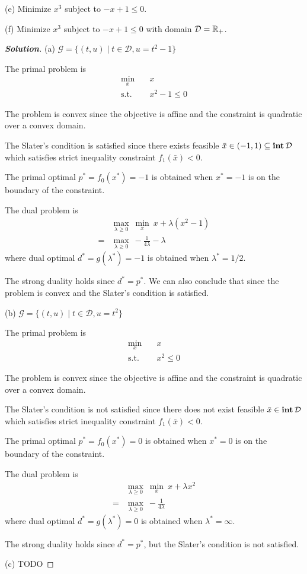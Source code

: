 \documentclass[11pt]{article}
\newenvironment{solution}
  {\renewcommand\qedsymbol{$\square$}\begin{proof}[\textbf{Solution}]}
  {\end{proof}}
\begin{document}
(e) Minimize $x^3$ subject to $-x + 1 \leq 0$.

(f) Minimize $x^3$ subject to $-x + 1 \leq 0$ with domain $\mathcal{D} = {{\mathbb{R}}}_+$.

\begin{solution}
(a) $\mathcal{G} = \{(t, u) \mid t\in\mathcal{D}, u = t^2-1\}$

The primal problem is
\begin{align*}
  \min_x \quad & x\\
  \text{s.t.} \quad & x^2 - 1 \leq 0
\end{align*}

The problem is convex since the objective is affine and the constraint is quadratic over a convex domain.

The Slater's condition is satisfied since there exists feasible $\bar x\in(-1, 1) \subseteq \mathop{\textbf{int}} \mathcal{D}$ which satisfies strict inequality constraint $f_1(\bar x) <0 $.

The primal optimal $p^* = f_0(x^*) = -1$ is obtained when $x^* = -1$ is on the boundary of the constraint.

The dual problem is
\begin{align*}
  &\max_{\lambda\geq 0}\ \min_x \ x + \lambda(x^2 - 1)\\
  =& \max_{\lambda\geq 0}\ - \frac{1}{4\lambda} -\lambda 
\end{align*}
where dual optimal $d^* = g(\lambda^*) = -1$ is obtained when $\lambda^* = 1/2$.

The strong duality holds since $d^* = p^*$. We can also conclude that since the problem is convex and the Slater's condition is satisfied.


(b) $\mathcal{G} = \{(t, u) \mid t\in\mathcal{D}, u = t^2\}$

The primal problem is
\begin{align*}
  \min_x \quad & x\\
  \text{s.t.} \quad & x^2 \leq 0
\end{align*}

The problem is convex since the objective is affine and the constraint is quadratic over a convex domain.

The Slater's condition is not satisfied since there does not exist feasible $\bar x\in \mathop{\textbf{int}} \mathcal{D}$ which satisfies strict inequality constraint $f_1(\bar x) < 0 $.

The primal optimal $p^* = f_0(x^*) = 0$ is obtained when $x^* = 0$ is on the boundary of the constraint.

The dual problem is
\begin{align*}
  &\max_{\lambda\geq 0}\ \min_x \ x + \lambda x^2\\
  =& \max_{\lambda\geq 0}\ - \frac{1}{4\lambda}
\end{align*}
where dual optimal $d^* = g(\lambda^*) = 0$ is obtained when $\lambda^* = \infty$.

The strong duality holds since $d^* = p^*$, but the Slater's condition is not satisfied.

(c) TODO

\end{solution}
\end{document}
